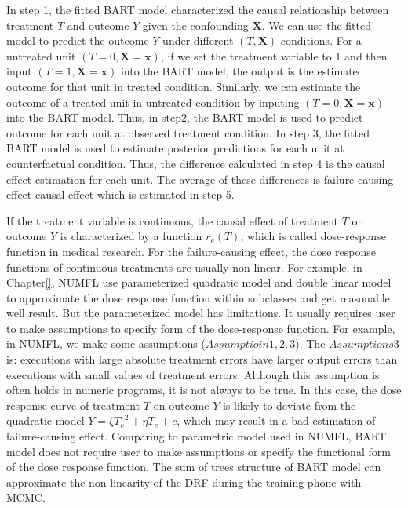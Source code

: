 In step 1, the fitted BART model characterized the causal relationship between treatment $T$ and outcome $Y$ given the confounding $\pmb{X}$. We can use the fitted model to predict the outcome $Y$ under different $(T, \pmb{X})$ conditions. For a untreated unit $(T=0, \pmb{X}=\pmb{x})$,  if we set the treatment variable to 1 and then input $(T=1, \pmb{X}=\pmb{x})$ into the BART model, the output is the estimated outcome for that unit in treated condition. Similarly, we can estimate the outcome of a treated unit in untreated condition by inputing $(T=0, \pmb{X}=\pmb{x})$ into the BART model. Thus, in step2, the BART model is used to predict outcome for each unit at observed treatment condition. In step 3, the fitted BART model is used to estimate posterior predictions for each unit at counterfactual condition. Thus, the difference calculated in step 4 is the causal effect estimation for each unit. The average of these differences is failure-causing effect causal effect which is estimated in step 5.

If the treatment variable is continuous, the causal effect of treatment $T$ on outcome $Y$ is characterized by a function $r_e (T)$, which is called dose-response function in medical research. For the failure-causing effect, the dose response functions of continuous treatments are usually non-linear. For example, in Chapter\ref{}, NUMFL use parameterized quadratic model and double linear model to approximate the dose response function within subclasses and get reasonable well result. But the parameterized model has limitations. It usually requires user to make assumptions to specify form of the dose-response function.  For example, in NUMFL, we make some assumptions ($Assumptioin 1, 2, 3$).  The  $Assumptions3$ is: executions with large absolute treatment errors have larger output errors than executions with small values of treatment errors.  Although this assumption is often holds in numeric programs, it is not always to be true. In this case,  the dose response curve of treatment $T$ on outcome $Y$ is likely to deviate from the quadratic model $Y = \zeta {T_e}^2 + \eta {T_e} + c$, which may result in a bad estimation of failure-causing effect. Comparing to parametric model used in NUMFL, BART model does not require user to make assumptions or specify the functional form of the dose response function. The sum of trees structure of BART model can approximate the non-linearity of the DRF during the training phone with MCMC. 

